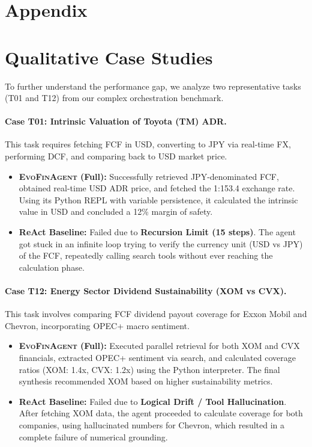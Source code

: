 \documentclass{article}
\begin{document}



\appendix

\section*{Appendix}

\section{Qualitative Case Studies}
To further understand the performance gap, we analyze two representative tasks (T01 and T12) from our complex orchestration benchmark.

\paragraph{Case T01: Intrinsic Valuation of Toyota (TM) ADR.}
This task requires fetching FCF in USD, converting to JPY via real-time FX, performing DCF, and comparing back to USD market price.
\begin{itemize}
    \item \textbf{\textsc{EvoFinAgent} (Full):} Successfully retrieved JPY-denominated FCF, obtained real-time USD ADR price, and fetched the 1:153.4 exchange rate. Using its Python REPL with variable persistence, it calculated the intrinsic value in USD and concluded a 12\% margin of safety.
    \item \textbf{ReAct Baseline:} Failed due to \textbf{Recursion Limit (15 steps)}. The agent got stuck in an infinite loop trying to verify the currency unit (USD vs JPY) of the FCF, repeatedly calling search tools without ever reaching the calculation phase.
\end{itemize}

\paragraph{Case T12: Energy Sector Dividend Sustainability (XOM vs CVX).}
This task involves comparing FCF dividend payout coverage for Exxon Mobil and Chevron, incorporating OPEC+ macro sentiment.
\begin{itemize}
    \item \textbf{\textsc{EvoFinAgent} (Full):} Executed parallel retrieval for both XOM and CVX financials, extracted OPEC+ sentiment via search, and calculated coverage ratios (XOM: 1.4x, CVX: 1.2x) using the Python interpreter. The final synthesis recommended XOM based on higher sustainability metrics.
    \item \textbf{ReAct Baseline:} Failed due to \textbf{Logical Drift / Tool Hallucination}. After fetching XOM data, the agent proceeded to calculate coverage for both companies, using hallucinated numbers for Chevron, which resulted in a complete failure of numerical grounding.
\end{itemize}
\end{document}
